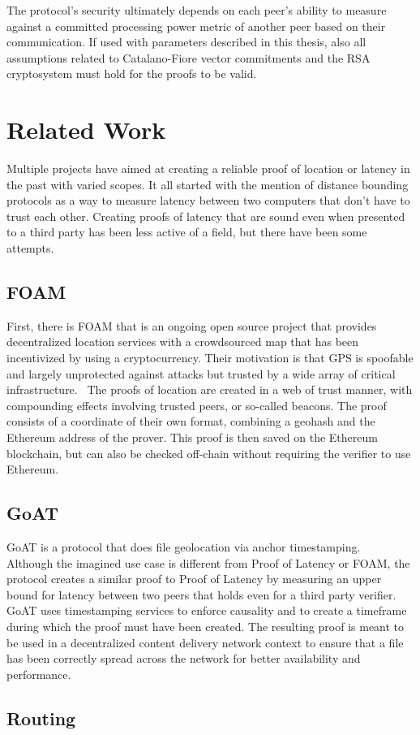 The protocol's security ultimately depends on each peer's ability to measure against a committed processing power metric of another peer based on their communication. If used with parameters described in this thesis, also all assumptions related to Catalano-Fiore vector commitments and the RSA cryptosystem must hold for the proofs to be valid.

\section{Related Work}
Multiple projects have aimed at creating a reliable proof of location or latency in the past with varied scopes. It all started with the mention of distance bounding protocols as a way to measure latency between two computers that don't have to trust each other. Creating proofs of latency that are sound even when presented to a third party has been less active of a field, but there have been some attempts.

\subsection{FOAM}
First, there is FOAM that is an ongoing open source project that provides decentralized location services with a crowdsourced map that has been incentivized by using a cryptocurrency. Their motivation is that GPS is spoofable and largely unprotected against attacks but trusted by a wide array of critical infrastructure.~\cite{Foamspace_Corp2018-me} The proofs of location are created in a web of trust manner, with compounding effects involving trusted peers, or so-called beacons. The proof consists of a coordinate of their own format, combining a geohash and the Ethereum address of the prover. This proof is then saved on the Ethereum blockchain, but can also be checked off-chain without requiring the verifier to use Ethereum.

\subsection{GoAT}
GoAT is a protocol that does file geolocation via anchor timestamping.~\cite{Maram_undated-it} Although the imagined use case is different from Proof of Latency or FOAM, the protocol creates a similar proof to Proof of Latency by measuring an upper bound for latency between two peers that holds even for a third party verifier. GoAT uses timestamping services to enforce causality and to create a timeframe during which the proof must have been created. The resulting proof is meant to be used in a decentralized content delivery network context to ensure that a file has been correctly spread across the network for better availability and performance.

\subsection{Routing}

